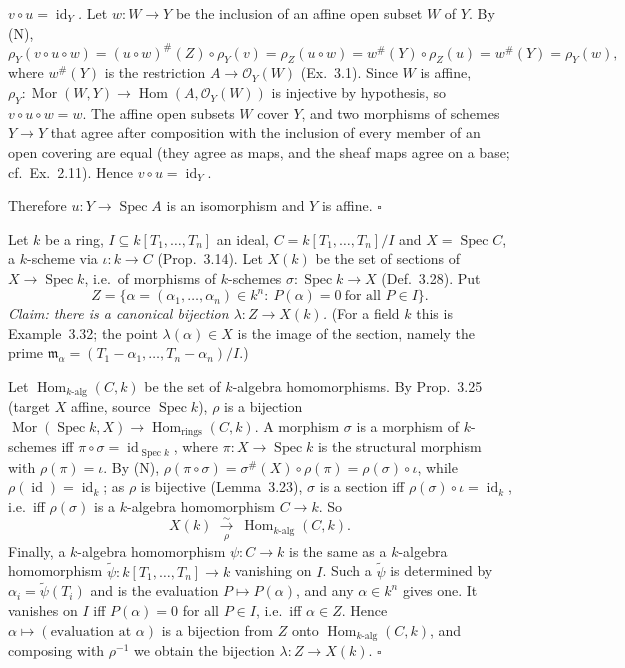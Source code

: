 \documentclass[11pt]{article}
\begin{document}
\emph{$v\circ u=\operatorname{id}_Y$.} Let $w:W\to Y$ be the inclusion of an affine open subset $W$ of $Y$. By (N),
\[ \rho_Y(v\circ u\circ w)=(u\circ w)^{\#}(Z)\circ\rho_Y(v)=\rho_Z(u\circ w)=w^{\#}(Y)\circ\rho_Z(u)=w^{\#}(Y)=\rho_Y(w), \]
where $w^{\#}(Y)$ is the restriction $A\to\mathcal{O}_Y(W)$ (Ex.~3.1). Since $W$ is affine, $\rho_Y:\operatorname{Mor}(W,Y)\to\operatorname{Hom}(A,\mathcal{O}_Y(W))$ is injective by hypothesis, so $v\circ u\circ w=w$. The affine open subsets $W$ cover $Y$, and two morphisms of schemes $Y\to Y$ that agree after composition with the inclusion of every member of an open covering are equal (they agree as maps, and the sheaf maps agree on a base; cf.\ Ex.~2.11). Hence $v\circ u=\operatorname{id}_Y$.

Therefore $u:Y\to\operatorname{Spec}A$ is an isomorphism and $Y$ is affine. \hfill$\square$

\pf
Let $k$ be a ring, $I\subseteq k[T_1,\dots,T_n]$ an ideal, $C=k[T_1,\dots,T_n]/I$ and $X=\operatorname{Spec}C$, a $k$-scheme via $\iota:k\to C$ (Prop.~3.14). Let $X(k)$ be the set of sections of $X\to\operatorname{Spec}k$, i.e.\ of morphisms of $k$-schemes $\sigma:\operatorname{Spec}k\to X$ (Def.~3.28). Put
\[ Z=\{\alpha=(\alpha_1,\dots,\alpha_n)\in k^n:\ P(\alpha)=0\ \text{for all }P\in I\}. \]
\emph{Claim: there is a canonical bijection $\lambda:Z\to X(k)$.} (For a field $k$ this is Example~3.32; the point $\lambda(\alpha)\in X$ is the image of the section, namely the prime $\mathfrak{m}_\alpha=(T_1-\alpha_1,\dots,T_n-\alpha_n)/I$.)

Let $\operatorname{Hom}_{k\text{-alg}}(C,k)$ be the set of $k$-algebra homomorphisms. By Prop.~3.25 (target $X$ affine, source $\operatorname{Spec}k$), $\rho$ is a bijection $\operatorname{Mor}(\operatorname{Spec}k,X)\to\operatorname{Hom}_{\text{rings}}(C,k)$. A morphism $\sigma$ is a morphism of $k$-schemes iff $\pi\circ\sigma=\operatorname{id}_{\operatorname{Spec}k}$, where $\pi:X\to\operatorname{Spec}k$ is the structural morphism with $\rho(\pi)=\iota$. By (N), $\rho(\pi\circ\sigma)=\sigma^{\#}(X)\circ\rho(\pi)=\rho(\sigma)\circ\iota$, while $\rho(\operatorname{id})=\operatorname{id}_k$; as $\rho$ is bijective (Lemma~3.23), $\sigma$ is a section iff $\rho(\sigma)\circ\iota=\operatorname{id}_k$, i.e.\ iff $\rho(\sigma)$ is a $k$-algebra homomorphism $C\to k$. So
\[ X(k)\ \xrightarrow[\ \rho\ ]{\sim}\ \operatorname{Hom}_{k\text{-alg}}(C,k). \]
Finally, a $k$-algebra homomorphism $\psi:C\to k$ is the same as a $k$-algebra homomorphism $\tilde\psi:k[T_1,\dots,T_n]\to k$ vanishing on $I$. Such a $\tilde\psi$ is determined by $\alpha_i=\tilde\psi(T_i)$ and is the evaluation $P\mapsto P(\alpha)$, and any $\alpha\in k^n$ gives one. It vanishes on $I$ iff $P(\alpha)=0$ for all $P\in I$, i.e.\ iff $\alpha\in Z$. Hence $\alpha\mapsto(\text{evaluation at }\alpha)$ is a bijection from $Z$ onto $\operatorname{Hom}_{k\text{-alg}}(C,k)$, and composing with $\rho^{-1}$ we obtain the bijection $\lambda:Z\to X(k)$. \hfill$\square$
\end{document}
